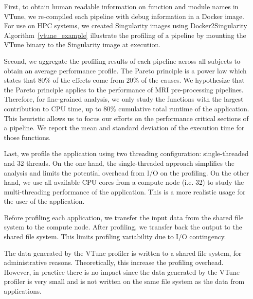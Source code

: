 \documentclass[conference]{IEEEtran}
\renewcommand{\lstlistingname}{Algorithm}
\begin{document}
First, to obtain human readable information on function and module names in VTune, we re-compiled each pipeline with debug information in a Docker image. For use on HPC systems, we created Singularity images using Docker2Singularity \lstlistingname~\ref{vtune_example} illustrate the profiling of a pipeline by mounting the VTune binary to the Singularity image at execution.

	
Second, we aggregate the profiling results of each pipeline across all subjects to obtain an average performance profile. The Pareto principle is a power law which states that 80\% of the effects come from 20\% of the causes. We hypothesize that the Pareto principle applies to the performance of MRI pre-processing pipelines. Therefore, for fine-grained analysis, we only study the functions with the largest contribution to CPU time, up to 80\% cumulative total runtime of the application. This heuristic allows us to focus our efforts on the performance critical sections of a pipeline. We report the mean and standard deviation of the execution time for those functions.

Last, we profile the application using two threading configuration: single-threaded and 32 threads. On the one hand, the single-threaded approach simplifies the analysis and limits the potential overhead from I/O on the profiling. 
On the other hand, we use all available CPU cores from a compute node (i.e. 32) to study the multi-threading performance of the application. This is a more realistic usage for the user of the application.

Before profiling each application, we transfer the input data from the shared file system to the compute node. After profiling, we transfer back the output to the shared file system. This limits profiling variability due to I/O contingency.

The data generated by the VTune profiler is written to a shared file system, for administrative reasons. Theoretically, this increase the profiling overhead. However, in practice there is no impact since the data generated by the VTune profiler is very small and is not written on the same file system as the data from applications.
\end{document}

